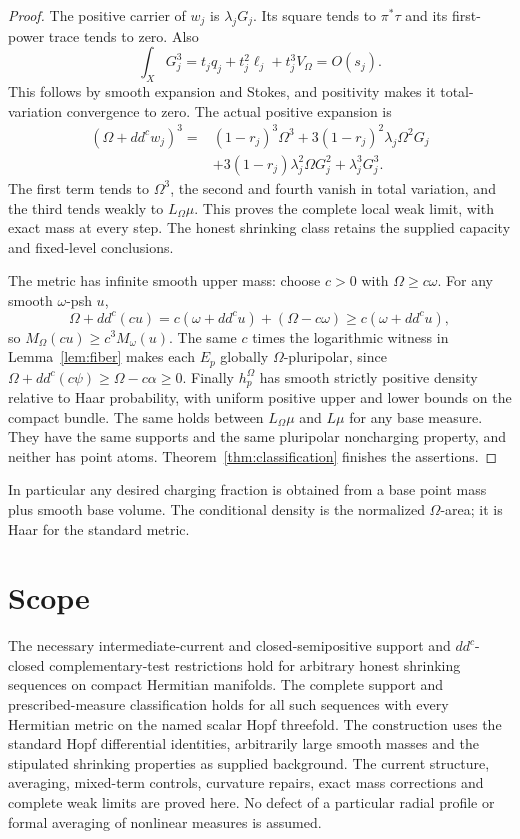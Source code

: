 \documentclass[11pt]{article}
\newcommand{\ddc}{dd^c}
\begin{document}
\begin{proof}
The positive carrier of $w_j$ is $\lambda_jG_j$.
Its square tends to $\pi^*\tau$ and its first-power trace tends
to zero. Also
\[
 \int_XG_j^3=t_jq_j+t_j^2\ell_j+t_j^3V_\Omega=O(s_j).
\]
This follows by smooth expansion and Stokes, and positivity makes
it total-variation convergence to zero. The actual positive expansion
is
\[
 \begin{split}
 (\Omega+\ddc w_j)^3={}&(1-r_j)^3\Omega^3
       +3(1-r_j)^2\lambda_j\Omega^2G_j\\
       &+3(1-r_j)\lambda_j^2\Omega G_j^2+\lambda_j^3G_j^3.
 \end{split}
\]
The first term tends to $\Omega^3$, the second and fourth vanish
in total variation, and the third tends weakly to $L_\Omega\mu$.
This proves the complete local weak limit, with exact mass at every
step. The honest shrinking class retains the supplied capacity and
fixed-level conclusions.

The metric has infinite smooth upper mass: choose $c>0$ with
$\Omega\geq c\omega$. For any smooth $\omega$-psh $u$,
\[
 \Omega+\ddc(cu)=c(\omega+\ddc u)+(\Omega-c\omega)
                           \geq c(\omega+\ddc u),
\]
so $M_\Omega(cu)\geq c^3M_\omega(u)$.
The same $c$ times the logarithmic witness in
Lemma~\ref{lem:fiber} makes each $E_p$ globally
$\Omega$-pluripolar, since $\Omega+\ddc(c\psi)\geq
\Omega-c\alpha\geq0$.
Finally $h_p^\Omega$ has smooth strictly positive density relative
to Haar probability, with uniform positive upper and lower bounds
on the compact bundle. The same holds between $L_\Omega\mu$ and
$L\mu$ for any base measure. They have the same supports and the
same pluripolar noncharging property, and neither has point atoms.
Theorem~\ref{thm:classification} finishes the assertions.
\end{proof}

In particular any desired charging fraction is obtained from a
base point mass plus smooth base volume. The conditional density
is the normalized $\Omega$-area; it is Haar for the standard metric.

\section{Scope}
The necessary intermediate-current and closed-semipositive support
and $dd^c$-closed complementary-test restrictions hold for arbitrary
honest shrinking sequences on compact Hermitian manifolds. The complete
support and prescribed-measure classification holds for all such
sequences with every Hermitian metric on the named scalar Hopf
threefold. The construction uses the standard Hopf differential
identities, arbitrarily large
smooth masses and the stipulated shrinking properties as supplied
background. The current structure, averaging, mixed-term controls,
curvature repairs, exact mass corrections and complete weak limits
are proved here. No defect of a particular radial profile or formal
averaging of nonlinear measures is assumed.
\end{document}
